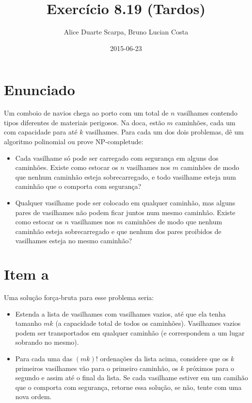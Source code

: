 \documentclass[11pt]{article}
\author{Alice Duarte Scarpa, Bruno Lucian Costa}
\date{2015-06-23}
\title{Exercício 8.19 (Tardos)}
\begin{document}
\maketitle

\section{Enunciado}
\label{sec-1}

Um comboio de navios chega ao porto com um total de $n$ vasilhames
contendo tipos diferentes de materiais perigosos.
Na doca, estão $m$ caminhões, cada um com capacidade para até $k$
vasilhames.  Para cada um dos dois problemas, dê um algoritmo
polinomial ou prove NP-completude:


\begin{itemize}
\item Cada vasilhame só pode ser carregado com segurança em alguns
dos caminhões. Existe como estocar os $n$ vasilhames nos $m$
caminhões de modo que nenhum caminhão esteja sobrecarregado, e
todo vasilhame esteja num caminhão que o comporta com segurança?

\item Qualquer vasilhame pode ser colocado em qualquer caminhão,
mas alguns pares de vasilhames não podem ficar juntos num mesmo
caminhão. Existe como estocar os $n$ vasilhames nos $m$
caminhões de modo que nenhum caminhão esteja sobrecarregado e
que nenhum dos pares proibidos de vasilhames esteja no mesmo
caminhão?
\end{itemize}

\section{Item a}
\label{sec-2}

Uma solução força-bruta para esse problema seria:

\begin{itemize}
\item Estenda a lista de vasilhames com vasilhames vazios, até que ela
tenha tamanho $mk$ (a capacidade total de todos os
caminhões). Vasilhames vazios podem ser transportados em qualquer
caminhão (e correspondem a um lugar sobrando no mesmo).
\item Para cada uma das $(mk)!$ ordenações da lista acima, considere que
os $k$ primeiros vasilhames vão para o primeiro caminhão, os $k$
próximos para o segundo e assim até o final da lista. Se cada
vasilhame estiver em um camihão que o comporta com segurança,
retorne essa solução, se não, tente com uma nova ordem.
\end{itemize}
\end{document}
